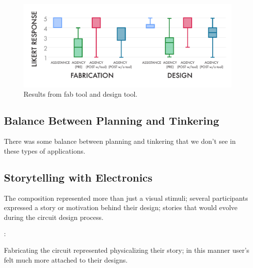 \documentclass{sigchi}
\begin{document}
\begin{figure}[t]
\centering
\includegraphics[width=1.0\columnwidth]{charts/boxplots_quant.pdf}
\caption{Results from fab tool and design tool. }
\label{fig:fab_tool_results}
\end{figure}


\subsection{Balance Between Planning and Tinkering}
  There was some balance between planning and tinkering that we don't see in these types of applications. 

\subsection{Storytelling with Electronics}
  The composition represented more than just a visual stimuli; several participants expressed a story or motivation behind their design; stories that would evolve during the circuit design process. 
  \begin{myquote}
   \vspace{-2pt}
    :
    \vspace{-2pt}
  \end{myquote} 
  Fabricating the circuit represented physicalizing their story; in this manner user's felt much more attached to their designs. 
\end{document}

